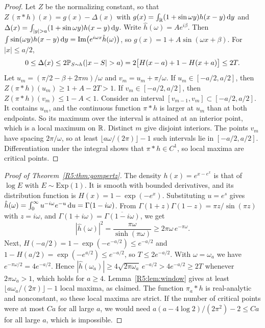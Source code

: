 \documentclass[11pt]{amsart}
\theoremstyle{definition}
\theoremstyle{remark}
\begin{document}
\begin{proof}
Let $Z$ be the normalizing constant, so that $Z\,(\pi*h)(x)=g(x)-\Delta(x)$
with $g(x)=\int_{\mathbb{R}}(1+\sin\omega y)h(x-y)\,\mathrm{d} y$ and
$\Delta(x)=\int_{|y|>a}(1+\sin\omega y)h(x-y)\Rfd y$.  Write
$\hat h(\omega)=Ae^{i\beta}$.  Then
$\int\sin(\omega y)h(x-y)\,\mathrm{d} y=\operatorname{Im}\bigl(e^{i\omega x}\hat h(\omega)\bigr)$,
so $g(x)=1+A\sin(\omega x+\beta)$.  For $|x|\le a/2$,
\[
 0\le\Delta(x)\le2\RfP_{S\sim h}(|x-S|>a)=2\bigl[H(x-a)+1-H(x+a)\bigr]\le2T .
\]
Let $u_m=(\pi/2-\beta+2\pi m)/\omega$ and $v_m=u_m+\pi/\omega$.  If
$u_m\in[-a/2,a/2]$, then $Z(\pi*h)(u_m)\ge1+A-2T>1$.  If
$v_m\in[-a/2,a/2]$, then $Z(\pi*h)(v_m)\le1-A<1$.  Consider an interval
$[v_{m-1},v_m]\subset[-a/2,a/2]$.  It contains $u_m$, and the continuous
function $\pi*h$ is larger at $u_m$ than at both endpoints.  So its maximum
over the interval is attained at an interior point, which is a local maximum
on $\mathbb{R}$.  Distinct $m$ give disjoint interiors.  The points $v_m$ have
spacing $2\pi/\omega$, so at least $\lfloor a\omega/(2\pi)\rfloor-1$ such
intervals lie in $[-a/2,a/2]$.  Differentiation under the integral shows
that $\pi*h\in C^1$, so local maxima are critical points.
\end{proof}

\begin{proof}[Proof of Theorem~\ref{R5:thm:gompertz}]
The density $h(x)=e^{x-e^x}$ is that of $\log E$ with $E\sim\mathrm{Exp}(1)$.
It is smooth with bounded derivatives, and its distribution function is
$H(x)=1-\exp(-e^x)$.  Substituting $u=e^s$ gives
$\hat h(\omega)=\int_0^\infty u^{-i\omega}e^{-u}\,\mathrm{d} u=\Gamma(1-i\omega)$.
From $\Gamma(1+z)\Gamma(1-z)=\pi z/\sin(\pi z)$ with $z=i\omega$, and
$\Gamma(1+i\omega)=\overline{\Gamma(1-i\omega)}$, we get
\[
 |\hat h(\omega)|^2=\frac{\pi\omega}{\sinh(\pi\omega)}\ge2\pi\omega\,e^{-\pi\omega}.
\]
Next, $H(-a/2)=1-\exp(-e^{-a/2})\le e^{-a/2}$ and
$1-H(a/2)=\exp(-e^{a/2})\le e^{-a/2}$, so $T\le2e^{-a/2}$.  With
$\omega=\omega_a$ we have $e^{-\pi\omega/2}=4e^{-a/2}$.  Hence
$|\hat h(\omega_a)|\ge4\sqrt{2\pi\omega_a}\,e^{-a/2}>4e^{-a/2}\ge2T$
whenever $2\pi\omega_a>1$, which holds for $a\ge4$.
Lemma~\ref{R5:lem:window} gives at least
$\lfloor a\omega_a/(2\pi)\rfloor-1$ local maxima, as claimed.  The function
$\pi_a*h$ is real-analytic and nonconstant, so these local maxima are
strict.  If the number of critical points were at most $Ca$ for all large
$a$, we would need $a(a-4\log2)/(2\pi^2)-2\le Ca$ for all large $a$, which
is impossible.
\end{proof}
\end{document}
